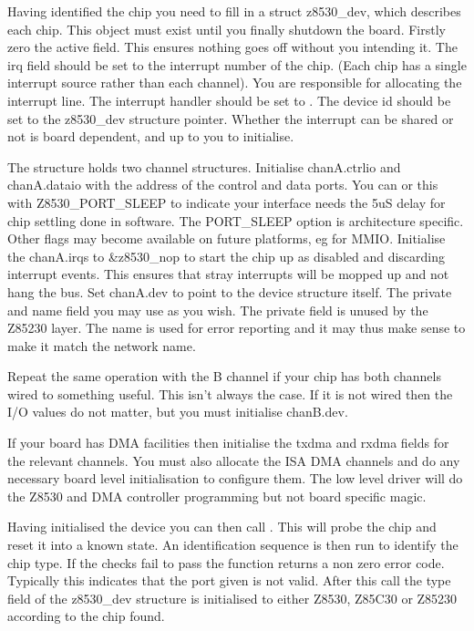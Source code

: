 \documentclass[a4paper,8pt,english]{sphinxmanual}
\begin{document}
Having identified the chip you need to fill in a struct z8530\_dev,
which describes each chip. This object must exist until you finally
shutdown the board. Firstly zero the active field. This ensures nothing
goes off without you intending it. The irq field should be set to the
interrupt number of the chip. (Each chip has a single interrupt source
rather than each channel). You are responsible for allocating the
interrupt line. The interrupt handler should be set to
{\hyperref[networking/z8530book:c.z8530_interrupt]{\emph{}}}. The device id should be set to the
z8530\_dev structure pointer. Whether the interrupt can be shared or not
is board dependent, and up to you to initialise.

The structure holds two channel structures. Initialise chanA.ctrlio and
chanA.dataio with the address of the control and data ports. You can or
this with Z8530\_PORT\_SLEEP to indicate your interface needs the 5uS
delay for chip settling done in software. The PORT\_SLEEP option is
architecture specific. Other flags may become available on future
platforms, eg for MMIO. Initialise the chanA.irqs to \&z8530\_nop to
start the chip up as disabled and discarding interrupt events. This
ensures that stray interrupts will be mopped up and not hang the bus.
Set chanA.dev to point to the device structure itself. The private and
name field you may use as you wish. The private field is unused by the
Z85230 layer. The name is used for error reporting and it may thus make
sense to make it match the network name.

Repeat the same operation with the B channel if your chip has both
channels wired to something useful. This isn't always the case. If it is
not wired then the I/O values do not matter, but you must initialise
chanB.dev.

If your board has DMA facilities then initialise the txdma and rxdma
fields for the relevant channels. You must also allocate the ISA DMA
channels and do any necessary board level initialisation to configure
them. The low level driver will do the Z8530 and DMA controller
programming but not board specific magic.

Having initialised the device you can then call
{\hyperref[networking/z8530book:c.z8530_init]{\emph{}}}. This will probe the chip and reset it into
a known state. An identification sequence is then run to identify the
chip type. If the checks fail to pass the function returns a non zero
error code. Typically this indicates that the port given is not valid.
After this call the type field of the z8530\_dev structure is
initialised to either Z8530, Z85C30 or Z85230 according to the chip
found.
\end{document}

